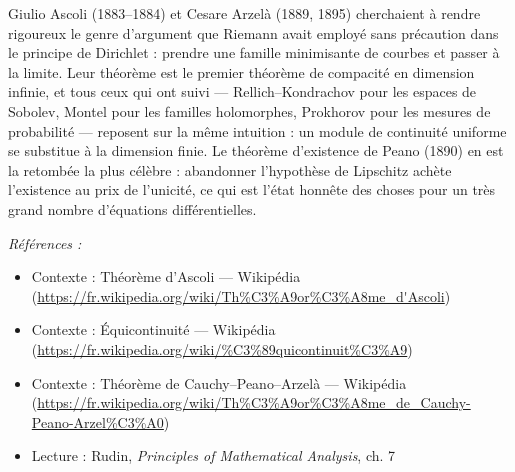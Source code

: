 \documentclass[11pt]{article}
\newenvironment{refs}{\par\small\noindent\emph{Références :}\begin{itemize}\setlength\itemsep{0pt}}{\end{itemize}\normalsize}
\begin{document}
\noindent Giulio Ascoli (1883--1884) et Cesare Arzelà (1889, 1895) cherchaient à rendre
rigoureux le genre d'argument que Riemann avait employé sans précaution dans le principe de
Dirichlet : prendre une famille minimisante de courbes et passer à la limite. Leur théorème est le
premier théorème de compacité en dimension infinie, et tous ceux qui ont suivi --- Rellich--Kondrachov
pour les espaces de Sobolev, Montel pour les familles holomorphes, Prokhorov pour les mesures de
probabilité --- reposent sur la même intuition : un module de continuité uniforme se substitue à la
dimension finie. Le théorème d'existence de Peano (1890) en est la retombée la plus célèbre :
abandonner l'hypothèse de Lipschitz achète l'existence au prix de l'unicité, ce qui est l'état
honnête des choses pour un très grand nombre d'équations différentielles.

\begin{refs}
\item Contexte : Théorème d'Ascoli --- Wikipédia (\url{https://fr.wikipedia.org/wiki/Th%C3%A9or%C3%A8me_d'Ascoli})
\item Contexte : Équicontinuité --- Wikipédia (\url{https://fr.wikipedia.org/wiki/%C3%89quicontinuit%C3%A9})
\item Contexte : Théorème de Cauchy--Peano--Arzelà --- Wikipédia (\url{https://fr.wikipedia.org/wiki/Th%C3%A9or%C3%A8me_de_Cauchy-Peano-Arzel%C3%A0})
\item Lecture : Rudin, \textit{Principles of Mathematical Analysis}, ch. 7
\end{refs}

\bigskip
\end{document}
